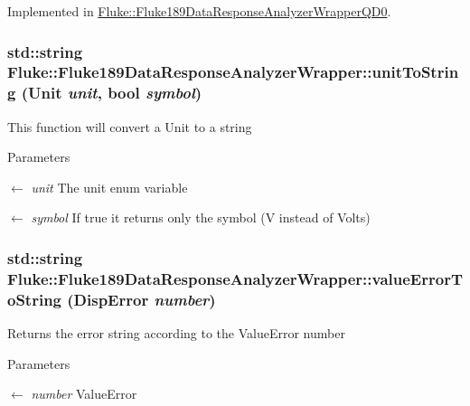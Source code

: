 Implemented in \hyperlink{classFluke_1_1Fluke189DataResponseAnalyzerWrapperQD0_aad8855dc897cc83a4a7b4df79657a724}{Fluke::Fluke189DataResponseAnalyzerWrapperQD0}.\hypertarget{classFluke_1_1Fluke189DataResponseAnalyzerWrapper_a377922abe231b285470386cd90dec3c0}{
\subsubsection[{unitToString}]{\setlength{\rightskip}{0pt plus 5cm}std::string Fluke::Fluke189DataResponseAnalyzerWrapper::unitToString ({\bf Unit} {\em unit}, \/  bool {\em symbol})}}
\label{classFluke_1_1Fluke189DataResponseAnalyzerWrapper_a377922abe231b285470386cd90dec3c0}
This function will convert a Unit to a string 
\begin{DoxyParams}{Parameters}
\item[\mbox{$\leftarrow$} {\em unit}]The unit enum variable \item[\mbox{$\leftarrow$} {\em symbol}]If true it returns only the symbol (V instead of Volts) \end{DoxyParams}
\hypertarget{classFluke_1_1Fluke189DataResponseAnalyzerWrapper_aa12dd607815d6ee1530a54855a4b3264}{
\subsubsection[{valueErrorToString}]{\setlength{\rightskip}{0pt plus 5cm}std::string Fluke::Fluke189DataResponseAnalyzerWrapper::valueErrorToString ({\bf DispError} {\em number})}}
\label{classFluke_1_1Fluke189DataResponseAnalyzerWrapper_aa12dd607815d6ee1530a54855a4b3264}
Returns the error string according to the ValueError number 
\begin{DoxyParams}{Parameters}
\item[\mbox{$\leftarrow$} {\em number}]ValueError \end{DoxyParams}
